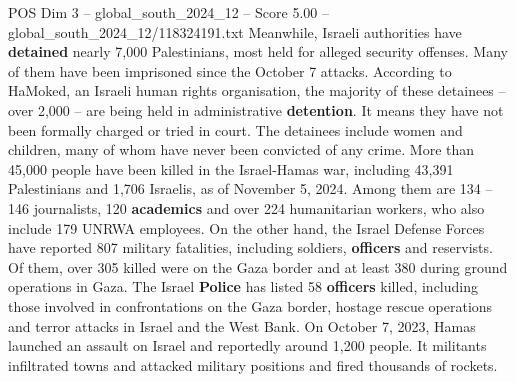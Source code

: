 \begin{textsample}{POS Dim 3 – global\_south\_2024\_12 – Score 5.00 – global\_south\_2024\_12/118324191.txt}
Meanwhile, Israeli authorities have \textbf{detained} nearly 7,000 Palestinians, most held for alleged security offenses.
Many of them have been imprisoned since the October 7 attacks.
According to HaMoked, an Israeli human rights organisation, the majority of these detainees -- over 2,000 -- are being held in administrative \textbf{detention}.
It means they have not been formally charged or tried in court.
The detainees include women and children, many of whom have never been convicted of any crime.
More than 45,000 people have been killed in the Israel-Hamas war, including 43,391 Palestinians and 1,706 Israelis, as of November 5, 2024.
Among them are 134 -- 146 journalists, 120 \textbf{academics} and over 224 humanitarian workers, who also include 179 UNRWA employees.
On the other hand, the Israel Defense Forces have reported 807 military fatalities, including soldiers, \textbf{officers} and reservists.
Of them, over 305 killed were on the Gaza border and at least 380 during ground operations in Gaza.
The Israel \textbf{Police} has listed 58 \textbf{officers} killed, including those involved in confrontations on the Gaza border, hostage rescue operations and terror attacks in Israel and the West Bank.
On October 7, 2023, Hamas launched an assault on Israel and reportedly around 1,200 people.
It militants infiltrated towns and attacked military positions and fired thousands of rockets.

\end{textsample}
